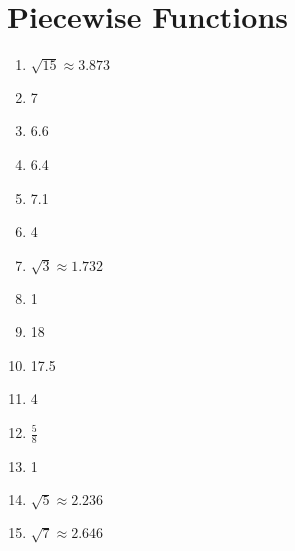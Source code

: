 \section*{Piecewise Functions}
\begin{multicols}{3}
\begin{enumerate}
    \item $\sqrt{15} \approx 3.873$
    \item 7
    \item 6.6
    \item 6.4
    \item 7.1
	\item 4
    \item $\sqrt{3} \approx 1.732$
    \item 1
    \item 18
    \item 17.5
    \item 4
    \item $\frac{5}{8}$
    \item 1
    \item $\sqrt{5} \approx 2.236$
    \item $\sqrt{7} \approx 2.646$
\end{enumerate}
\end{multicols}

